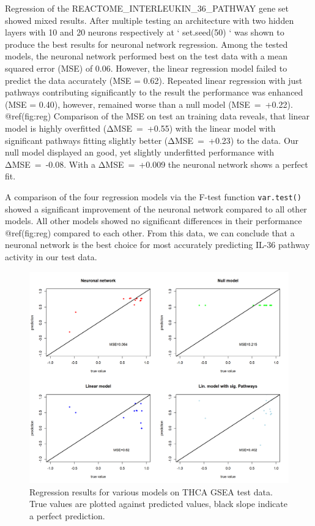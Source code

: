 \documentclass[
]{article}
\begin{document}
Regression of the REACTOME\_INTERLEUKIN\_36\_PATHWAY gene set showed
mixed results. After multiple testing an architecture with two hidden
layers with 10 and 20 neurons respectively at ` set.seed(50) ` was shown
to produce the best results for neuronal network regression. Among the
tested models, the neuronal network performed best on the test data with
a mean squared error (MSE) of 0.06. However, the linear regression model
failed to predict the data accurately (MSE = 0.62). Repeated linear
regression with just pathways contributing significantly to the result
the performance was enhanced (MSE = 0.40), however, remained worse than
a null model (MSE~=~+0.22). @ref(fig:reg) Comparison of the MSE on test
an training data reveals, that linear model is highly overfitted
(ΔMSE~=~+0.55) with the linear model with significant pathways fitting
slightly better (ΔMSE~=~+0.23) to the data. Our null model displayed an
good, yet slightly underfitted performance with ΔMSE~=~-0.08. With a
ΔMSE~=~+0.009 the neuronal network shows a perfect fit.

A comparison of the four regression models via the F-test function
\texttt{var.test()} showed a significant improvement of the neuronal
network compared to all other models. All other models showed no
significant differences in their performance @ref(fig:reg) compared to
each other. From this data, we can conclude that a neuronal network is
the best choice for most accurately predicting IL-36 pathway activity in
our test data.

\begin{figure}

{\centering \includegraphics[width=0.8\linewidth]{figures/Regression comparison plot IL36 genes} 

}

\caption{Regression results for various models on THCA GSEA test data. True values are plotted against predicted values, black slope indicate a perfect prediction.}\label{fig:reg}
\end{figure}
\end{document}

